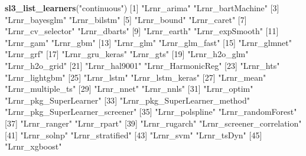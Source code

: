 \documentclass[12pt, krantz2,]{krantz}
\newenvironment{Shaded}{\begin{snugshade}}{\end{snugshade}}
\newcommand{\DecValTok}[1]{\textcolor[rgb]{0.06,0.06,0.06}{#1}}
\newcommand{\KeywordTok}[1]{\textcolor[rgb]{0.27,0.27,0.27}{\textbf{#1}}}
\newcommand{\NormalTok}[1]{#1}
\newcommand{\StringTok}[1]{\textcolor[rgb]{0.5,0.5,0.5}{#1}}
\theoremstyle{definition}
\theoremstyle{definition}
\theoremstyle{definition}
\newcommand{\1}{\mathbbm{1}}
\begin{document}
\begin{Shaded}
\begin{Highlighting}[]
\KeywordTok{sl3_list_learners}\NormalTok{(}\StringTok{"continuous"}\NormalTok{)}
\NormalTok{ [}\DecValTok{1}\NormalTok{] }\StringTok{"Lrnr_arima"}                     \StringTok{"Lrnr_bartMachine"}              
\NormalTok{ [}\DecValTok{3}\NormalTok{] }\StringTok{"Lrnr_bayesglm"}                  \StringTok{"Lrnr_bilstm"}                   
\NormalTok{ [}\DecValTok{5}\NormalTok{] }\StringTok{"Lrnr_bound"}                     \StringTok{"Lrnr_caret"}                    
\NormalTok{ [}\DecValTok{7}\NormalTok{] }\StringTok{"Lrnr_cv_selector"}               \StringTok{"Lrnr_dbarts"}                   
\NormalTok{ [}\DecValTok{9}\NormalTok{] }\StringTok{"Lrnr_earth"}                     \StringTok{"Lrnr_expSmooth"}                
\NormalTok{[}\DecValTok{11}\NormalTok{] }\StringTok{"Lrnr_gam"}                       \StringTok{"Lrnr_gbm"}                      
\NormalTok{[}\DecValTok{13}\NormalTok{] }\StringTok{"Lrnr_glm"}                       \StringTok{"Lrnr_glm_fast"}                 
\NormalTok{[}\DecValTok{15}\NormalTok{] }\StringTok{"Lrnr_glmnet"}                    \StringTok{"Lrnr_grf"}                      
\NormalTok{[}\DecValTok{17}\NormalTok{] }\StringTok{"Lrnr_gru_keras"}                 \StringTok{"Lrnr_gts"}                      
\NormalTok{[}\DecValTok{19}\NormalTok{] }\StringTok{"Lrnr_h2o_glm"}                   \StringTok{"Lrnr_h2o_grid"}                 
\NormalTok{[}\DecValTok{21}\NormalTok{] }\StringTok{"Lrnr_hal9001"}                   \StringTok{"Lrnr_HarmonicReg"}              
\NormalTok{[}\DecValTok{23}\NormalTok{] }\StringTok{"Lrnr_hts"}                       \StringTok{"Lrnr_lightgbm"}                 
\NormalTok{[}\DecValTok{25}\NormalTok{] }\StringTok{"Lrnr_lstm"}                      \StringTok{"Lrnr_lstm_keras"}               
\NormalTok{[}\DecValTok{27}\NormalTok{] }\StringTok{"Lrnr_mean"}                      \StringTok{"Lrnr_multiple_ts"}              
\NormalTok{[}\DecValTok{29}\NormalTok{] }\StringTok{"Lrnr_nnet"}                      \StringTok{"Lrnr_nnls"}                     
\NormalTok{[}\DecValTok{31}\NormalTok{] }\StringTok{"Lrnr_optim"}                     \StringTok{"Lrnr_pkg_SuperLearner"}         
\NormalTok{[}\DecValTok{33}\NormalTok{] }\StringTok{"Lrnr_pkg_SuperLearner_method"}   \StringTok{"Lrnr_pkg_SuperLearner_screener"}
\NormalTok{[}\DecValTok{35}\NormalTok{] }\StringTok{"Lrnr_polspline"}                 \StringTok{"Lrnr_randomForest"}             
\NormalTok{[}\DecValTok{37}\NormalTok{] }\StringTok{"Lrnr_ranger"}                    \StringTok{"Lrnr_rpart"}                    
\NormalTok{[}\DecValTok{39}\NormalTok{] }\StringTok{"Lrnr_rugarch"}                   \StringTok{"Lrnr_screener_correlation"}     
\NormalTok{[}\DecValTok{41}\NormalTok{] }\StringTok{"Lrnr_solnp"}                     \StringTok{"Lrnr_stratified"}               
\NormalTok{[}\DecValTok{43}\NormalTok{] }\StringTok{"Lrnr_svm"}                       \StringTok{"Lrnr_tsDyn"}                    
\NormalTok{[}\DecValTok{45}\NormalTok{] }\StringTok{"Lrnr_xgboost"}                  
\end{Highlighting}
\end{Shaded}
\end{document}
